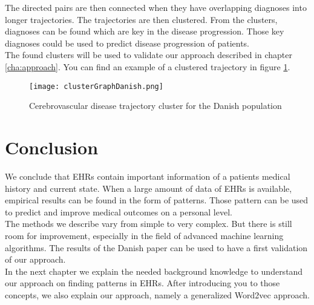 The directed pairs are then connected when they have overlapping diagnoses into longer trajectories. The trajectories are then clustered. From the clusters, diagnoses can be found which are key in the disease progression. Those key diagnoses could be used to predict disease progression of patients. \\

The found clusters will be used to validate our approach described in chapter \ref{cha:approach}. You can find an example of a clustered trajectory in figure \ref{fig:clusterGraphDanish}.

\begin{figure}[H]
	\centering
	\texttt{[image: clusterGraphDanish.png]}
	\caption{Cerebrovascular disease trajectory cluster for the Danish population \cite{Brunak:article}}
	\label{fig:clusterGraphDanish}
\end{figure}


\section{Conclusion}

We conclude that EHRs contain important information of a patients medical history and current state. When a large amount of data of EHRs is available, empirical results can be found in the form of patterns. Those pattern can be used to predict and improve medical outcomes on a personal level. \\
The methods we describe vary from simple to very complex. But there is still room for improvement, especially in the field of advanced machine learning algorithms. The results of the Danish paper can be used to have a first validation of our approach. \\

In the next chapter we explain the needed background knowledge to understand our approach on finding patterns in EHRs. After introducing you to those concepts, we also explain our approach, namely a generalized Word2vec approach.


